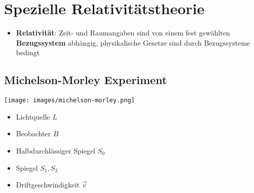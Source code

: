 \section{Spezielle Relativitätstheorie}%
\label{srel:sec:spezielle_relativitaetstheorie}

\begin{itemize}
	\item \textbf{Relativität}: Zeit- und Raumangaben sind von einem fest gewählten \textbf{Bezugssystem} abhängig, physikalische Gesetze sind durch Bezugssysteme bedingt
\end{itemize}

\subsection{Michelson-Morley Experiment}%
\label{srel:sub:michelson_morley_experiment}

\begin{minipage}{0.5\textwidth}
	\begin{center}
		\texttt{[image: images/michelson-morley.png]}
	\end{center}	
\end{minipage}
\begin{minipage}{0.5\textwidth}
	\begin{itemize}
		\item Lichtquelle $L$
		\item Beobachter $B$
		\item Halbdurchlässiger Spiegel $S_0$
		\item Spiegel $S_1, S_2$
		\item Driftgeschwindigkeit $\vec{v}$
	\end{itemize}
\end{minipage}

